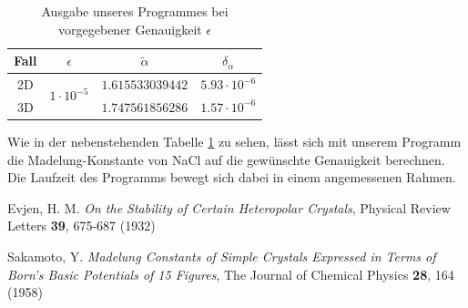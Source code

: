 \documentclass[10pt,a4paper]{article}
\begin{document}
\begin{table}
\vspace{-15pt}
\begin{tabular}{c|c|c|c}
Fall & $\epsilon$                       & $\tilde{\alpha}$ & $\delta_\alpha$    \\ \hline
2D   & \multirow{2}{*}{$1\cdot10^{-5}$} & $1.615533039442$ & $5.93\cdot10^{-6}$ \\ \cline{1-1} \cline{3-4} 
3D   &                                  & $1.747561856286$ & $1.57\cdot10^{-6}$ \\
\end{tabular}
\caption{Ausgabe unseres Programmes bei vorgegebener Genauigkeit $\epsilon$}
\label{tab:ausgabe}
\end{table}
Wie in der nebenstehenden Tabelle \ref{tab:ausgabe} zu sehen, lässt sich mit unserem Programm die Madelung-Konstante von NaCl auf die gewünschte Genauigkeit berechnen. Die Laufzeit des Programms bewegt sich dabei in einem angemessenen Rahmen.

\begin{thebibliography}{9}

Evjen, H. M.
\emph{On the Stability of Certain Heteropolar Crystals},
Physical Review Letters \textbf{39},
675-687 (1932)

Sakamoto, Y.
\emph{Madelung Constants of Simple Crystals Expressed in Terms of Born's Basic
Potentials of 15 Figures},
The Journal of Chemical Physics \textbf{28},
164 (1958)

\end{thebibliography}
\end{document}
